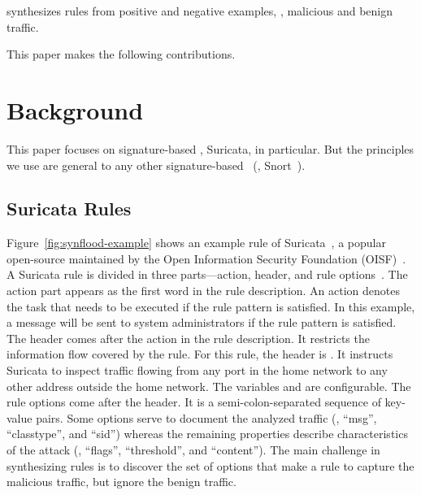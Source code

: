 \documentclass[runningheads]{llncs}
\begin{document}

\tname{} synthesizes rules from positive and negative examples, \ie{},
malicious and benign traffic.



This paper makes the following contributions.

\section{Background}

This paper focuses on signature-based \nids, Suricata, in
particular. But the principles we use are general to any other
signature-based \nids~(\eg{}, Snort~\cite{snort}).

\subsection{Suricata Rules}
\label{sec:example-suricata-rules}

Figure~\ref{fig:synflood-example} shows an example rule of
Suricata~\cite{suricata}, a popular open-source \nids{} maintained by
the Open Information Security Foundation (OISF)~\cite{oisf}. A
Suricata rule is divided in three parts---action, header, and rule
options~\cite{suri-rule-format}. The action part appears as the first
word in the rule description. An action denotes the task that needs to
be executed if the rule pattern is satisfied. In this example, a
message will be sent to system administrators if the rule pattern is
satisfied. The header comes after the action in the rule
description. It restricts the information flow covered by the
rule. For this rule, the header is . It instructs Suricata to inspect 
traffic flowing from any port in the home network to any other address
outside the home network. The variables  and
 are configurable. The rule options come after
the header. It is a semi-colon-separated sequence of key-value
pairs. Some options serve to document the analyzed traffic (\eg{},
``msg'', ``classtype'', and ``sid'') whereas the remaining properties
describe characteristics of the attack (\eg, ``flags'', ``threshold'',
and ``content''). The main challenge in synthesizing rules is to
discover the set of options that make a rule to capture the malicious
traffic, but ignore the benign traffic.
\end{document}
